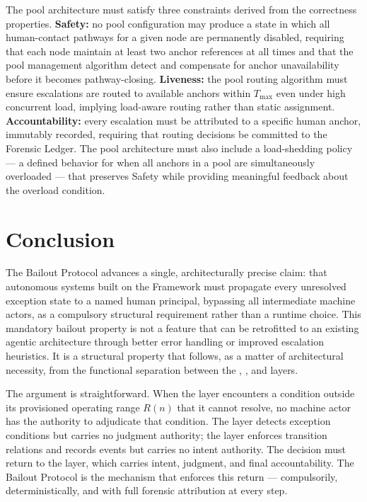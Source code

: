 The pool architecture must satisfy three constraints derived from the correctness properties. \textbf{Safety:} no pool configuration may produce a state in which all human-contact pathways for a given node are permanently disabled, requiring that each node maintain at least two anchor references at all times and that the pool management algorithm detect and compensate for anchor unavailability before it becomes pathway-closing. \textbf{Liveness:} the pool routing algorithm must ensure escalations are routed to available anchors within $T_{\max}$ even under high concurrent load, implying load-aware routing rather than static assignment. \textbf{Accountability:} every escalation must be attributed to a specific human anchor, immutably recorded, requiring that routing decisions be committed to the Forensic Ledger. The pool architecture must also include a load-shedding policy --- a defined behavior for when all anchors in a pool are simultaneously overloaded --- that preserves Safety while providing meaningful feedback about the overload condition.

\section{Conclusion}
\label{sec:conclusion}

The Bailout Protocol advances a single, architecturally precise claim: that autonomous systems built on the \bxthree{} Framework must propagate every unresolved exception state to a named human principal, bypassing all intermediate machine actors, as a compulsory structural requirement rather than a runtime choice. This mandatory bailout property is not a feature that can be retrofitted to an existing agentic architecture through better error handling or improved escalation heuristics. It is a structural property that follows, as a matter of architectural necessity, from the functional separation between the \purpose{}, \bounds{}, and \fact{} layers.

The argument is straightforward. When the \bounds{} layer encounters a condition outside its provisioned operating range $R(n)$ that it cannot resolve, no machine actor has the authority to adjudicate that condition. The \bounds{} layer detects exception conditions but carries no judgment authority; the \fact{} layer enforces transition relations and records events but carries no intent authority. The decision must return to the \purpose{} layer, which carries intent, judgment, and final accountability. The Bailout Protocol is the mechanism that enforces this return --- compulsorily, deterministically, and with full forensic attribution at every step.

